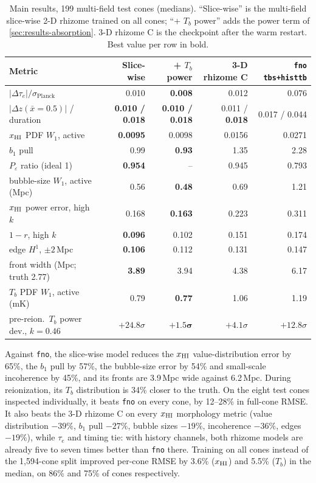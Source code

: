 \begin{table}[!tp]
  \centering
  \caption{Main results, 199 multi-field test cones (medians). ``Slice-wise'' is the multi-field slice-wise 2-D rhizome trained on all cones; ``+ $T_b$ power'' adds the power term of \cref{sec:results-absorption}. 3-D rhizome C is the checkpoint after the warm restart. Best value per row in bold.}
  \label{tab:main-results}
  \small
  \setlength{\tabcolsep}{4pt}
  \begin{tabular}{@{}lrrrr@{}}
    \toprule
    Metric & Slice-wise & + $T_b$ power & 3-D rhizome C & \texttt{fno} \texttt{tbs+histtb} \\
    \midrule
    $|\Delta\tau_e|/\sigma_{\mathrm{Planck}}$ & 0.010 & \textbf{0.008} & 0.012 & 0.076 \\
    $|\Delta z(\bar x=0.5)|$ / duration & \textbf{0.010 / 0.018} & \textbf{0.010 / 0.018} & 0.011 / \textbf{0.018} & 0.017 / 0.044 \\
    $x_{\mathrm{HI}}$ PDF $W_1$, active & \textbf{0.0095} & 0.0098 & 0.0156 & 0.0271 \\
    $b_1$ pull & 0.99 & \textbf{0.93} & 1.35 & 2.28 \\
    $P_\varepsilon$ ratio (ideal 1) & \textbf{0.954} & -- & 0.945 & 0.793 \\
    bubble-size $W_1$, active (Mpc) & 0.56 & \textbf{0.48} & 0.69 & 1.21 \\
    $x_{\mathrm{HI}}$ power error, high $k$ & 0.168 & \textbf{0.163} & 0.223 & 0.311 \\
    $1-r$, high $k$ & \textbf{0.096} & 0.102 & 0.151 & 0.174 \\
    edge $H^1$, $\pm2$\,Mpc & \textbf{0.106} & 0.112 & 0.131 & 0.147 \\
    front width (Mpc; truth 2.77) & \textbf{3.89} & 3.94 & 4.38 & 6.17 \\
    $T_b$ PDF $W_1$, active (mK) & 0.79 & \textbf{0.77} & 1.06 & 1.19 \\
    pre-reion.\ $T_b$ power dev., $k=0.46$ & $+24.8\sigma$ & $\bm{+1.5\sigma}$ & $+4.1\sigma$ & $+12.8\sigma$ \\
    \bottomrule
  \end{tabular}
\end{table}

Against \texttt{fno}, the slice-wise model reduces the $x_{\mathrm{HI}}$ value-distribution error by 65\%, the $b_1$ pull by 57\%, the bubble-size error by 54\% and small-scale incoherence by 45\%, and its fronts are 3.9\,Mpc wide against 6.2\,Mpc. During reionization, its $T_b$ distribution is 34\% closer to the truth. On the eight test cones inspected individually, it beats \texttt{fno} on every cone, by 12--28\% in full-cone RMSE. It also beats the 3-D rhizome C on every $x_{\mathrm{HI}}$ morphology metric (value distribution $-39\%$, $b_1$ pull $-27\%$, bubble sizes $-19\%$, incoherence $-36\%$, edges $-19\%$), while $\tau_e$ and timing tie: with history channels, both rhizome models are already five to seven times better than \texttt{fno} there. Training on all cones instead of the 1,594-cone split improved per-cone RMSE by 3.6\% ($x_{\mathrm{HI}}$) and 5.5\% ($T_b$) in the median, on 86\% and 75\% of cones respectively.

